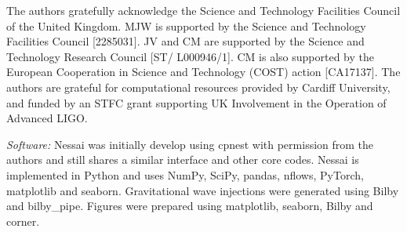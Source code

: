 \documentclass[%
 reprint,
nofootinbib,
 amsmath,amssymb,
 aps,
 prd,
]{revtex4-2}
\newcommand{\nessai}{{\sc Nessai}\xspace}
\newcommand{\bilby}{{\sc Bilby}\xspace}
\newcommand{\bilbypipe}{{\sc bilby\_pipe}\xspace}
\newcommand{\cpnest}{{\sc cpnest}\xspace}
\newcommand{\nflows}{{\sc nflows}\xspace}
\newcommand{\pytorch}{{\sc PyTorch}\xspace}
\newcommand{\corner}{{\sc corner}\xspace}
\newcommand{\matplotlib}{{\sc matplotlib}\xspace}
\newcommand{\seaborn}{{\sc seaborn}\xspace}
\newcommand{\numpy}{{\sc NumPy}\xspace}
\newcommand{\scipy}{{\sc SciPy}\xspace}
\newcommand{\pandas}{{\sc pandas}\xspace}
\newcommand{\python}{{\sc Python}\xspace}
\begin{document}
\begin{acknowledgments}

The authors gratefully acknowledge the Science and Technology Facilities Council of the United Kingdom. MJW is supported by the Science and Technology Facilities Council [2285031]. JV and CM are supported by the Science and Technology Research Council [ST/ L000946/1]. CM is also supported by the European Cooperation in Science and Technology (COST) action [CA17137]. The authors are grateful for computational resources provided by Cardiff University, and funded by an STFC grant supporting UK Involvement in the Operation of Advanced LIGO.

\textit{Software:} \nessai was initially develop using \cpnest \cite{Veitch:2021cpnest} with permission from the authors and still shares a similar interface and other core codes. \nessai is implemented in \python and uses \numpy \cite{numpy}, \scipy \cite{2020SciPy-NMeth}, \pandas \cite{reback2020pandas,mckinney-proc-scipy-2010}, \nflows \cite{nflows}, \pytorch \cite{Paszke:2019:pt}, \matplotlib \cite{Hunter:2007} and \seaborn \cite{waskom2020seaborn}. Gravitational wave injections were generated using \bilby and \bilbypipe \cite{Ashton:2019}. Figures were prepared using \matplotlib \cite{Hunter:2007}, \seaborn \cite{waskom2020seaborn}, \bilby \cite{Ashton:2019} and \corner \cite{corner}.

\end{acknowledgments}
\end{document}
